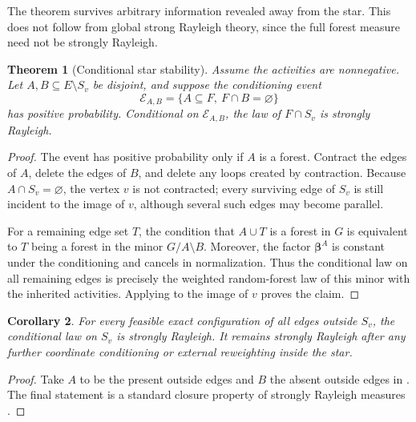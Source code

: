 \documentclass[11pt]{article}
\numberwithin{equation}{section}
\newtheorem{theorem}{Theorem}[section]
\newtheorem{corollary}[theorem]{Corollary}
\newcommand{\betab}{\bm\beta}
\begin{document}
The theorem survives arbitrary information revealed away from the star.  This does not follow from global strong Rayleigh theory, since the full forest measure need not be strongly Rayleigh.

\begin{theorem}[Conditional star stability]\label{thm:conditional-star}
Assume the activities are nonnegative.  Let $A,B\subseteq E\setminus S_v$ be disjoint, and suppose the conditioning event
\begin{equation}\label{eq:conditioning-event}
 \mathcal E_{A,B}=\{A\subseteq F,\ F\cap B=\varnothing\}
\end{equation}
has positive probability.  Conditional on $\mathcal E_{A,B}$, the law of $F\cap S_v$ is strongly Rayleigh.
\end{theorem}

\begin{proof}
The event has positive probability only if $A$ is a forest.  Contract the edges of $A$, delete the edges of $B$, and delete any loops created by contraction.  Because $A\cap S_v=\varnothing$, the vertex $v$ is not contracted; every surviving edge of $S_v$ is still incident to the image of $v$, although several such edges may become parallel.

For a remaining edge set $T$, the condition that $A\cup T$ is a forest in $G$ is equivalent to $T$ being a forest in the minor $G/A\setminus B$.  Moreover, the factor $\betab^A$ is constant under the conditioning and cancels in normalization.  Thus the conditional law on all remaining edges is precisely the weighted random-forest law of this minor with the inherited activities.  Applying  to the image of $v$ proves the claim.
\end{proof}

\begin{corollary}\label{cor:exact-outside}
For every feasible exact configuration of all edges outside $S_v$, the conditional law on $S_v$ is strongly Rayleigh.  It remains strongly Rayleigh after any further coordinate conditioning or external reweighting inside the star.
\end{corollary}

\begin{proof}
Take $A$ to be the present outside edges and $B$ the absent outside edges in .  The final statement is a standard closure property of strongly Rayleigh measures \cite{BorceaBrandenLiggett2009}.
\end{proof}
\end{document}
